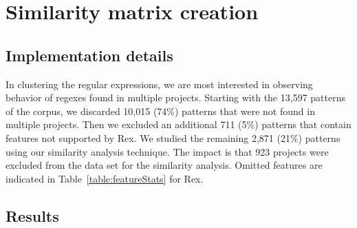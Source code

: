 \section{Similarity matrix creation}

\subsection{Implementation details}

In clustering the regular expressions, we are most interested in observing behavior of regexes found in multiple projects.  Starting with the 13,597 patterns of the corpus, we discarded 10,015 (74\%) patterns that were not found in multiple projects.
Then we excluded an additional 711 (5\%) patterns that contain features not supported by Rex.  We studied the remaining 2,871 (21\%) patterns using our similarity analysis technique. The impact is that 923 projects were excluded from the data set for the similarity analysis. Omitted features are indicated in Table~\ref{table:featureStats} for Rex.

\subsection{Results}
